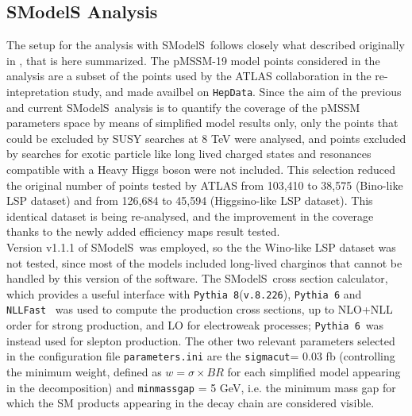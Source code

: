 \documentclass[a4paper,10pt]{article}
\newcommand{\SMO}{{\sc SModelS}}
\begin{document}
\subsection{SModelS Analysis}
The setup for the analysis with \SMO~follows closely what described originally in \cite{Ambrogi:2017lov}, that is here summarized. The pMSSM-19 model points considered in the analysis are a subset of the points used by the ATLAS collaboration in the re-intepretation study\cite{Aad:2015baa}, and made availbel on \texttt{HepData}\cite{ATLASpMSSMhepdata}. Since the aim of the previous and current \SMO~analysis is to quantify the coverage of the pMSSM parameters space by means of simplified model results only, only the points that could be excluded by SUSY searches at 8 TeV were analysed, and points excluded by searches for exotic particle like long lived charged states and resonances compatible with a Heavy Higgs boson were not included. This selection reduced the original number of points tested by ATLAS from 103,410 to 38,575 (Bino-like LSP dataset) and from 126,684 to 45,594 (Higgsino-like LSP dataset). This identical dataset is being re-analysed, and the improvement in the coverage thanks to the newly added efficiency maps result tested. 
\\
Version v1.1.1 of \SMO~was employed, so the the Wino-like LSP dataset was not tested, since most of the models included long-lived charginos that cannot be handled by this version of the software.
The \SMO~cross section calculator, which provides a useful interface with \texttt{Pythia 8}(\texttt{v.8.226})\cite{Sjostrand:2014zea}, \texttt{Pythia 6}\cite{Sjostrand:2006za} and \texttt{NLLFast}~\cite{nllfast,Beenakker:1996ch,Kulesza:2008jb,Kulesza:2009kq,Beenakker:2009ha,Beenakker:2011fu,Beenakker:1997ut,Beenakker:2010nq} was used to compute the production cross sections, up to NLO+NLL order for strong production, and LO for electroweak processes; \texttt{Pythia 6}~was instead used for slepton production. The other two relevant parameters selected in the configuration file \texttt{parameters.ini} are the \texttt{sigmacut}= 0.03 fb (controlling the minimum weight, defined as $w = \sigma \times BR$ for each simplified model appearing in the decomposition) and \verb|minmassgap| = 5 GeV, i.e. the minimum mass gap for which the SM products appearing in the decay chain are considered visible.
\\
\end{document}
